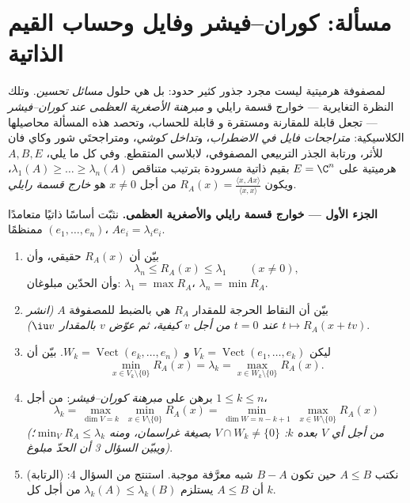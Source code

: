 \section{مسألة: كوران--فيشر وفايل وحساب القيم الذاتية}

\begin{problem}\label{pb:b2:hermitian:1}
 لمصفوفة هرميتية ليست مجرد جذور
كثير حدود: بل هي حلول \emph{مسائل تحسين}.
وتلك النظرة التغايرية --- خوارج قسمة رايلي و
\emph{مبرهنة الأصغرية العظمى عند كوران--فيشر} --- تجعل  قابلة للمقارنة ومستقرة و
قابلة للحساب، وتحصد هذه المسألة محاصيلها الكلاسيكية:
\emph{متراجحات فايل في الاضطراب}، و\emph{تداخل كوشي}، ومتراجحتَي شور وكاي فان
للأثر، ورتابة الجذر التربيعي المصفوفي،
 لابلاسي المتقطع. وفي كل ما يلي، $A, B,
E$ هرميتية على $E = \C^n$ بقيم ذاتية مسرودة بترتيب
متناقص $\lambda_1(A) \geq \dots \geq \lambda_n(A)$،
ويكون $R_A(x) = \frac{\langle x, Ax\rangle}{\langle x, x\rangle}$
من أجل $x \neq 0$ هو \emph{خارج قسمة رايلي}.

\medskip
\noindent\textbf{الجزء الأول --- خوارج قسمة رايلي والأصغرية العظمى.}
نثبّت أساسًا ذاتيًا متعامدًا ممنظمًا $(e_1, \dots, e_n)$، $Ae_i =
\lambda_ie_i$.
\begin{enumerate}
  \item بيّن أن $R_A(x)$ حقيقي، وأن
        \[
        \lambda_n \leq R_A(x) \leq \lambda_1
        \qquad (x \neq 0),
        \]
        وأن الحدّين مبلوغان: $\lambda_1 = \max R_A$،
        $\lambda_n = \min R_A$.
  \item بيّن أن النقاط الحرجة للمقدار $R_A$ هي بالضبط
         للمصفوفة $A$ \emph{(انشر $t \mapsto R_A(x +
        tv)$ عند $t = 0$ من أجل $v$ كيفية، ثم عوّض $v$ بالمقدار
        $\iu v$)}.
  \item ليكن $V_k = \operatorname{Vect}(e_1, \dots, e_k)$ و
        $W_k = \operatorname{Vect}(e_k, \dots, e_n)$. بيّن أن
        \[
        \min_{x \in V_k\setminus\{0\}} R_A(x) = \lambda_k
        = \max_{x \in W_k\setminus\{0\}} R_A(x) .
        \]
  \item برهن على \emph{مبرهنة كوران--فيشر}: من أجل $1 \leq
        k \leq n$،
        \[
        \lambda_k = \max_{\dim V = k}\;\min_{x \in
        V\setminus\{0\}} R_A(x)
        = \min_{\dim W = n-k+1}\;\max_{x \in
        W\setminus\{0\}} R_A(x)
        \]
        \emph{(من أجل أي $V$ بعده $k$: $V \cap W_k \neq
        \{0\}$ بصيغة غراسمان، ومنه $\min_V R_A \leq \lambda_k$؛
        ويبيّن السؤال 3 أن الحدّ مبلوغ)}.
  \item (الرتابة) نكتب $A \leq B$ حين تكون $B - A$
        شبه معرَّفة موجبة. استنتج من السؤال 4: أن $A \leq
        B$ يستلزم $\lambda_k(A) \leq \lambda_k(B)$ من أجل كل
        $k$.
\end{enumerate}


\end{problem}
